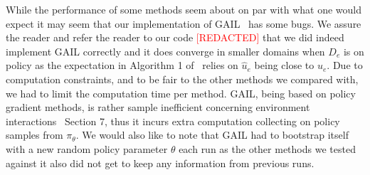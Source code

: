 \documentclass[10pt]{article}
\renewcommand{\cite}{\citep}
\theoremstyle{plain}
\theoremstyle{remark}
\newcommand{\gersi}[1]{\textcolor{red}{[#1]}}
\begin{document}
While the performance of some methods seem about on par with what one would expect it may seem that our implementation of GAIL~\cite{Ho2016}
has some bugs. We assure the reader and refer the reader to our code \gersi{REDACTED} that we did indeed implement GAIL correctly and it does converge in smaller domains when $D_e$ is on policy as the expectation in Algorithm 1 of~\cite{Ho2016} relies on $\hat{u}_e$ being close to $u_e$. Due to computation constraints, and to be fair to the other methods we compared with, we had to limit the computation time per method. GAIL, being based on policy gradient methods, is rather sample inefficient concerning environment interactions~\cite{Ho2016} Section 7, thus it incurs extra computation collecting on policy samples from $\pi_\theta$. We would also like to note that GAIL had to bootstrap itself with a new random policy parameter $\theta$ each run as the other methods we tested against it also did not get to keep any information from previous runs.
    
    
    
    
    
\end{document}
